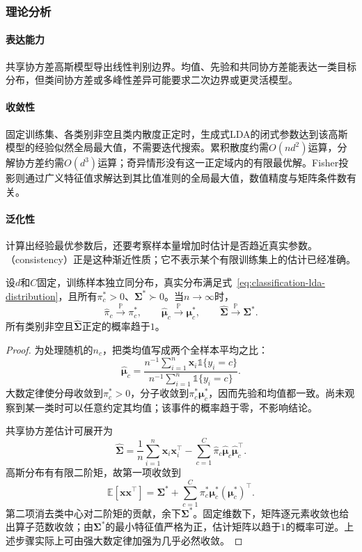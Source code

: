 \subsubsection{理论分析}
\label{sec:classification-lda-analysis}

\paragraph{表达能力}
共享协方差高斯模型导出线性判别边界。均值、先验和共同协方差能表达一类目标分布，但类间协方差或多峰性差异可能要求二次边界或更灵活模型。

\paragraph{收敛性}
固定训练集、各类别非空且类内散度正定时，生成式LDA的闭式参数达到该高斯模型的经验似然全局最大值，不需要迭代搜索。累积散度约需$O(nd^2)$运算，分解协方差约需$O(d^3)$运算；奇异情形没有这一正定域内的有限最优解。Fisher投影则通过广义特征值求解达到其比值准则的全局最大值，数值精度与矩阵条件数有关。

\paragraph{泛化性}
计算出经验最优参数后，还要考察样本量增加时估计是否趋近真实参数。（consistency）正是这种渐近性质；它不表示某个有限训练集上的估计已经准确。

\begin{theorem}[LDA参数估计的一致性]
  \label{thm:classification-lda-consistency}
  设$d$和$C$固定，训练样本独立同分布，真实分布满足式~\eqref{eq:classification-lda-distribution}，且所有$\pi_c^\ast>0$、$\bm{\Sigma}^\ast\succ0$。当$n\to\infty$时，
  \[
    \hat\pi_c\xrightarrow{\mathbb{P}}\pi_c^\ast,\qquad
    \hat{\bm{\mu}}_c\xrightarrow{\mathbb{P}}\bm{\mu}_c^\ast,\qquad
    \hat{\bm{\Sigma}}\xrightarrow{\mathbb{P}}\bm{\Sigma}^\ast .
  \]
  所有类别非空且$\hat{\bm{\Sigma}}$正定的概率趋于$1$。
\end{theorem}

\begin{proof}
  为处理随机的$n_c$，把类均值写成两个全样本平均之比：
  \[
    \hat{\bm{\mu}}_c
      =\frac{n^{-1}\sum_{i=1}^{n}\bm{x}_i\mathbb{1}\{y_i=c\}}
        {n^{-1}\sum_{i=1}^{n}\mathbb{1}\{y_i=c\}} .
  \]
  大数定律使分母收敛到$\pi_c^\ast>0$，分子收敛到$\pi_c^\ast\bm{\mu}_c^\ast$，因而先验和均值都一致。尚未观察到某一类时可以任意约定其均值；该事件的概率趋于零，不影响结论。

  共享协方差估计可展开为
  \[
    \hat{\bm{\Sigma}}
      =\frac1n\sum_{i=1}^{n}\bm{x}_i\bm{x}_i^{\top}
        -\sum_{c=1}^{C}\hat\pi_c
          \hat{\bm{\mu}}_c\hat{\bm{\mu}}_c^{\top}.
  \]
  高斯分布有有限二阶矩，故第一项收敛到
  \[
    \mathbb{E}[\bm{x}\bm{x}^{\top}]
      =\bm{\Sigma}^\ast+
        \sum_{c=1}^{C}\pi_c^\ast
          \bm{\mu}_c^\ast(\bm{\mu}_c^\ast)^{\top}.
  \]
  第二项消去类中心对二阶矩的贡献，余下$\bm{\Sigma}^\ast$。固定维数下，矩阵逐元素收敛也给出算子范数收敛；由$\bm{\Sigma}^\ast$的最小特征值严格为正，估计矩阵以趋于$1$的概率可逆。上述步骤实际上可由强大数定律加强为几乎必然收敛。
\end{proof}

